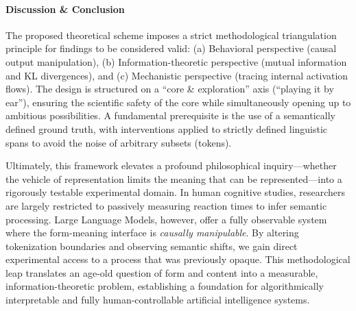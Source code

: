 \documentclass[11pt,a4paper]{article}
\begin{document}
\paragraph{Discussion \& Conclusion}
The proposed theoretical scheme imposes a strict methodological triangulation principle for findings to be considered valid: (a) Behavioral perspective (causal output manipulation), (b) Information-theoretic perspective (mutual information and KL divergences), and (c) Mechanistic perspective (tracing internal activation flows). The design is structured on a ``core \& exploration'' axis (``playing it by ear''), ensuring the scientific safety of the core while simultaneously opening up to ambitious possibilities. A fundamental prerequisite is the use of a semantically defined ground truth, with interventions applied to strictly defined linguistic spans to avoid the noise of arbitrary subsets (tokens).

Ultimately, this framework elevates a profound philosophical inquiry---whether the vehicle of representation limits the meaning that can be represented---into a rigorously testable experimental domain. In human cognitive studies, researchers are largely restricted to passively measuring reaction times to infer semantic processing. Large Language Models, however, offer a fully observable system where the form-meaning interface is \emph{causally manipulable}. By altering tokenization boundaries and observing semantic shifts, we gain direct experimental access to a process that was previously opaque. This methodological leap translates an age-old question of form and content into a measurable, information-theoretic problem, establishing a foundation for algorithmically interpretable and fully human-controllable artificial intelligence systems.
\end{document}
